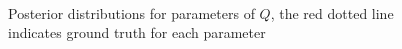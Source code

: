\documentclass{article}
\begin{document}
\begin{figure}[h]
  \centering
  \mbox{
    \quad
    }
  \caption{Posterior distributions for parameters of $Q$, the red dotted line indicates ground truth for each parameter}
  \label{fig:postQ}
\end{figure}
\end{document}
